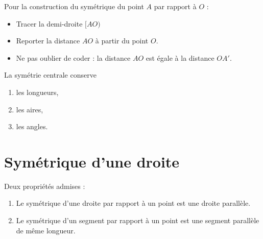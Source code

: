 Pour la construction du symétrique du point \( A\) par rapport à \( O\) :
\begin{itemize}
    \item Tracer la demi-droite \(  [AO) \)
    \item Reporter la distance \( AO\) à partir du point \( O\).
    \item Ne pas oublier de coder : la distance \( AO\) est égale à la distance \( OA'\).
\end{itemize}

\begin{center}
    
\end{center}

\begin{propriete}
    La symétrie centrale conserve
    \begin{enumerate}
        \item
            les longueurs,
        \item
            les aires,
        \item
            les angles.
    \end{enumerate}
\end{propriete}

\begin{center}
   
\end{center}

\section{Symétrique d'une droite}



Deux propriétés admises :
\begin{propriete}
    \begin{enumerate}
        \item
            Le symétrique d'une droite par rapport à un point est une droite parallèle.
        \item
            Le symétrique d'un segment par rapport à un point est une segment parallèle de même longueur.
    \end{enumerate}
\end{propriete}
